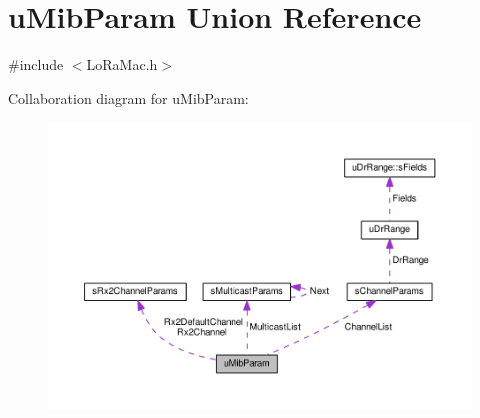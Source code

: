 \hypertarget{unionuMibParam}{}\section{u\+Mib\+Param Union Reference}
\label{unionuMibParam}


{\ttfamily \#include $<$Lo\+Ra\+Mac.\+h$>$}



Collaboration diagram for u\+Mib\+Param\+:
\nopagebreak
\begin{figure}[H]
\begin{center}
\leavevmode
\includegraphics[width=350pt]{unionuMibParam__coll__graph}
\end{center}
\end{figure}
